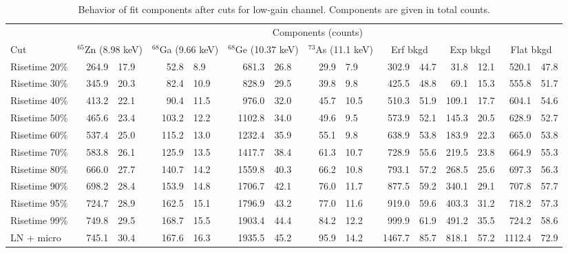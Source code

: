 						\begin{sidewaystable}
							\centering
							\footnotesize
							\begin{tabular}{l  r@{$~\pm~$}l  r@{$~\pm~$}l  r@{$~\pm~$}l  r@{$~\pm~$}l  r@{$~\pm~$}l  r@{$~\pm~$}l  r@{$~\pm~$}l  }
								\toprule 
								& \multicolumn{14}{c}{Components (counts)} \\
								\cmidrule[1pt]{2-14} 
								Cut & \multicolumn{2}{c}{$^{65}$Zn (8.98 keV)} & \multicolumn{2}{c}{$^{68}$Ga (9.66 keV)} & \multicolumn{2}{c}{$^{68}$Ge (10.37 keV)} & \multicolumn{2}{c}{$^{73}$As (11.1 keV)} & \multicolumn{2}{c}{Erf bkgd} & \multicolumn{2}{c}{Exp bkgd} & \multicolumn{2}{c}{Flat bkgd}  \\
								\midrule
							        	 Risetime 20\% & 264.9 & 17.9 & 52.8 & 8.9 & 681.3 & 26.8 & 29.9 & 7.9 & 302.9 & 44.7 & 31.8 & 12.1 & 520.1 & 47.8  \\
									 Risetime 30\% & 345.9 & 20.3 & 82.4 & 10.9 & 828.9 & 29.5 & 39.8 & 9.8 & 425.5 & 48.8 & 69.1 & 15.3 & 555.8 & 51.7  \\
									 Risetime 40\% & 413.2 & 22.1 & 90.4 & 11.5 & 976.0 & 32.0 & 45.7 & 10.5 & 510.3 & 51.9 & 109.1 & 17.7 & 604.1 & 54.6  \\
									 Risetime 50\% & 465.6 & 23.4 & 103.2 & 12.2 & 1102.8 & 34.0 & 49.6 & 9.5 & 573.9 & 52.1 & 145.3 & 20.5 & 628.9 & 52.7  \\
									 Risetime 60\% & 537.4 & 25.0 & 115.2 & 13.0 & 1232.4 & 35.9 & 55.1 & 9.8 & 638.9 & 53.8 & 183.9 & 22.3 & 665.0 & 53.8  \\
									 Risetime 70\% & 583.8 & 26.1 & 125.9 & 13.5 & 1417.7 & 38.4 & 61.3 & 10.7 & 728.9 & 55.6 & 219.5 & 23.8 & 664.9 & 55.3  \\
									 Risetime 80\% & 666.0 & 27.7 & 140.7 & 14.2 & 1559.8 & 40.3 & 66.2 & 10.8 & 793.1 & 57.2 & 268.5 & 25.6 & 697.3 & 56.3  \\
									 Risetime 90\% & 698.2 & 28.4 & 153.9 & 14.8 & 1706.7 & 42.1 & 76.0 & 11.7 & 877.5 & 59.2 & 340.1 & 29.1 & 707.8 & 57.7  \\
									 Risetime 95\% & 724.7 & 28.9 & 162.5 & 15.1 & 1796.9 & 43.2 & 77.0 & 11.6 & 919.0 & 59.6 & 403.3 & 31.2 & 718.2 & 57.3  \\
									 Risetime 99\% & 749.8 & 29.5 & 168.7 & 15.5 & 1903.4 & 44.4 & 84.2 & 12.2 & 999.9 & 61.9 & 491.2 & 35.5 & 724.2 & 58.6  \\
									 LN + micro & 745.1 & 30.4 & 167.6 & 16.3 & 1935.5 & 45.2 & 95.9 & 14.2 & 1467.7 & 85.7 & 818.1 & 57.2 & 1112.4 & 72.9  \\
								 
								\bottomrule
							\end{tabular}

							\caption[Behavior of fit components after cuts for low-gain BeGe channel]
							{Behavior of fit components after cuts for low-gain channel.  Components are given in total counts.}
							\label{tab:RTLowGainResults}
						\end{sidewaystable}						

